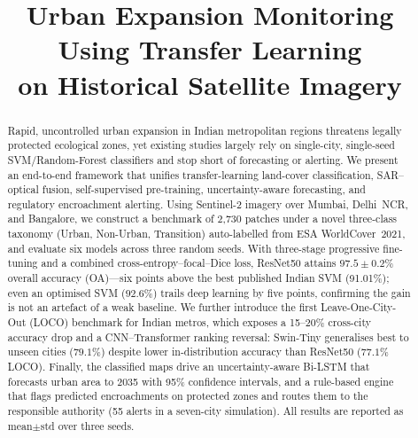 \documentclass[conference]{IEEEtran}
\begin{document}
\title{Urban Expansion Monitoring Using Transfer Learning\\
on Historical Satellite Imagery}

\author{%
}

\maketitle

\begin{abstract}
Rapid, uncontrolled urban expansion in Indian metropolitan regions threatens legally protected ecological zones, yet existing studies largely rely on single-city, single-seed SVM/Random-Forest classifiers and stop short of forecasting or alerting. We present an end-to-end framework that unifies transfer-learning land-cover classification, SAR--optical fusion, self-supervised pre-training, uncertainty-aware forecasting, and regulatory encroachment alerting. Using Sentinel-2 imagery over Mumbai, Delhi~NCR, and Bangalore, we construct a benchmark of 2{,}730 patches under a novel three-class taxonomy (Urban, Non-Urban, Transition) auto-labelled from ESA WorldCover~2021, and evaluate six models across three random seeds. With three-stage progressive fine-tuning and a combined cross-entropy--focal--Dice loss, ResNet50 attains $97.5 \pm 0.2\%$ overall accuracy (OA)---six points above the best published Indian SVM (91.01\%); even an optimised SVM ($92.6\%$) trails deep learning by five points, confirming the gain is not an artefact of a weak baseline. We further introduce the first Leave-One-City-Out (LOCO) benchmark for Indian metros, which exposes a 15--20\% cross-city accuracy drop and a CNN--Transformer ranking reversal: Swin-Tiny generalises best to unseen cities ($79.1\%$) despite lower in-distribution accuracy than ResNet50 ($77.1\%$ LOCO). Finally, the classified maps drive an uncertainty-aware Bi-LSTM that forecasts urban area to 2035 with 95\% confidence intervals, and a rule-based engine that flags predicted encroachments on protected zones and routes them to the responsible authority (55 alerts in a seven-city simulation). All results are reported as mean$\pm$std over three seeds.
\end{abstract}
\end{document}
